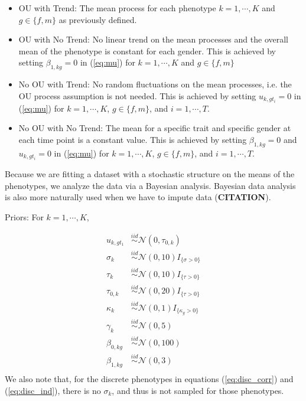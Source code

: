 \documentclass[
  12pt,
]{article}
\begin{document}
\begin{itemize}
\item OU with Trend: The mean process for each phenotype $k=1,\cdots,K$ and $g \in \{f,m\}$ as previously defined.
\item OU with No Trend: No linear trend on the mean processes and the overall mean of the phenotype is constant for each gender. This is achieved by setting $\beta_{1,kg} = 0$ in (\ref{eq:mu}) for $k = 1,\cdots,K$ and $g \in \{f,m\}$
\item No OU with Trend: No random fluctuations on the mean processes, i.e. the OU process assumption is not needed. This is achieved by setting $u_{k,gt_i} = 0$ in (\ref{eq:mu}) for $k = 1,\cdots,K$, $g \in \{f,m\}$, and $i = 1,\cdots,T$.
\item No OU with No Trend: The mean for a specific trait and specific gender at each time point is a constant value. This is achieved by setting $\beta_{1,kg} = 0$ and $u_{k,gt_i} = 0$ in (\ref{eq:mu}) for $k = 1,\cdots,K$, $g \in \{f,m\}$, and $i = 1,\cdots,T$.
\end{itemize}

Because we are fitting a dataset with a stochastic structure on the
means of the phenotypes, we analyze the data via a Bayesian analysis.
Bayesian data analysis is also more naturally used when we have to
impute data (\textbf{CITATION}).

Priors: For \(k = 1,\cdots,K\),

\begin{align}
u_{k,gt_1} & \overset{iid}{\sim}\mathcal{N}(0,\tau_{0,k}) \nonumber \\
\sigma_k & \overset{iid}{\sim}\mathcal{N}(0,10)I_{\{\sigma > 0\}} \nonumber \\
\tau_k & \overset{iid}{\sim}\mathcal{N}(0,10)I_{\{\tau > 0\}} \nonumber \\
\tau_{0,k} & \overset{iid}{\sim}\mathcal{N}(0,20)I_{\{\tau > 0\}} \nonumber \\
\kappa_k & \overset{iid}{\sim}\mathcal{N}(0,1)I_{\{\kappa_g > 0\}} \nonumber \\
\gamma_{k} & \overset{iid}{\sim}\mathcal{N}(0,5) \nonumber \\
\beta_{0,kg} & \overset{iid}{\sim}\mathcal{N}(0,100) \nonumber \\
\beta_{1,kg} & \overset{iid}{\sim}\mathcal{N}(0,3) \nonumber \\
\label{eq:priors}
\end{align} We also note that, for the discrete phenotypes in equations
(\ref{eq:disc_corr}) and (\ref{eq:disc_ind}), there is no \(\sigma_k\),
and thus is not sampled for those phenotypes.
\end{document}
